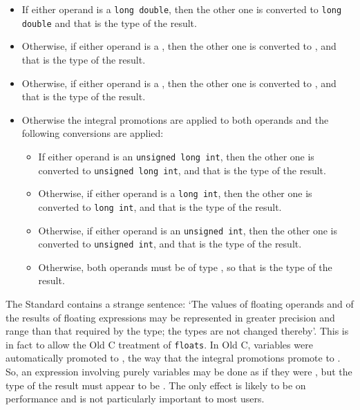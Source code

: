     \begin{itemize}
     \item If either operand is a \texttt{long double}, then the other one
      is converted to \texttt{long double} and that is the type of the
      result.

     \item Otherwise, if either operand is a \double, then the other
      one is converted to \double, and that is the type of the
      result.

     \item Otherwise, if either operand is a \float, then the other
      one is converted to \float, and that is the type of the
      result.

     \item Otherwise the integral promotions are applied to both operands and
      the following conversions are applied:

      \begin{itemize}
       \item If either operand is an \texttt{unsigned long int}, then the
        other one is converted to \texttt{unsigned long int}, and that is
        the type of the result.

       \item Otherwise, if either operand is a \texttt{long int}, then the
        other one is converted to \texttt{long int}, and that is the type
        of the result.

       \item Otherwise, if either operand is an \texttt{unsigned int}, then
        the other one is converted to \texttt{unsigned int}, and that is
        the type of the result.

       \item Otherwise, both operands must be of type \kint, so that
        is the type of the result.
      \end{itemize}
     
    \end{itemize}

    The Standard contains a strange sentence: `The values of floating
     operands and of the results of floating expressions may be represented in
     greater precision and range than that required by the type; the types are
     not changed thereby'. This is in fact to allow the Old C
     treatment of \texttt{floats}. In Old C, \float{}
     variables were automatically promoted to \double, the way
     that the integral promotions promote \kchar{} to
     \kint. So, an expression involving purely \float{}
     variables may be done as if they were \double, but the type
     of the result must appear to be \float. The only effect is
     likely to be on performance and is not particularly important to most
     users.


